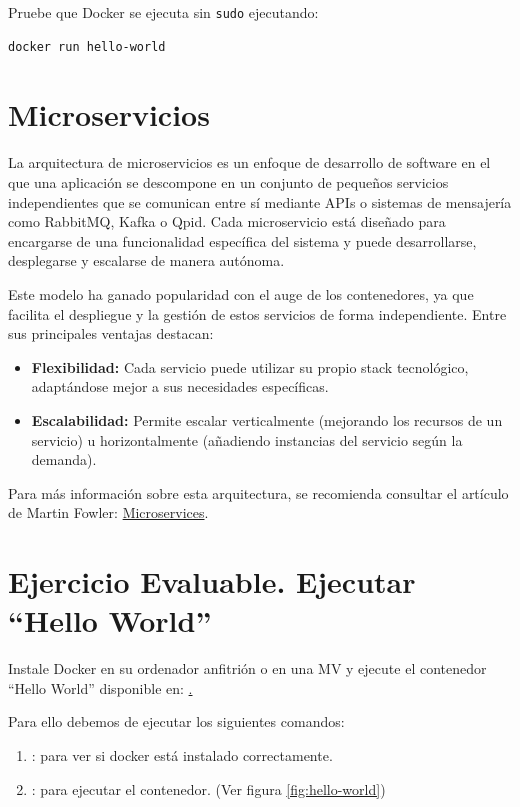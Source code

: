 Pruebe que Docker se ejecuta sin \texttt{sudo} ejecutando:

\begin{lstlisting}[style=customstyle]
docker run hello-world
\end{lstlisting}


\section{Microservicios}

La arquitectura de microservicios es un enfoque de desarrollo de software en el que una aplicación se descompone en un conjunto de pequeños servicios independientes que se comunican entre sí mediante APIs o sistemas de mensajería como RabbitMQ, Kafka o Qpid. Cada microservicio está diseñado para encargarse de una funcionalidad específica del sistema y puede desarrollarse, desplegarse y escalarse de manera autónoma.

Este modelo ha ganado popularidad con el auge de los contenedores, ya que facilita el despliegue y la gestión de estos servicios de forma independiente. Entre sus principales ventajas destacan:

\begin{itemize}
    \item \textbf{Flexibilidad:} Cada servicio puede utilizar su propio stack tecnológico, adaptándose mejor a sus necesidades específicas.
    \item \textbf{Escalabilidad:} Permite escalar verticalmente (mejorando los recursos de un servicio) u horizontalmente (añadiendo instancias del servicio según la demanda).
\end{itemize}

Para más información sobre esta arquitectura, se recomienda consultar el artículo de Martin Fowler: \href{https://martinfowler.com/articles/microservices.html}{Microservices}.

\section{Ejercicio Evaluable. Ejecutar “Hello World”}

Instale Docker en su ordenador anfitrión o en una MV y ejecute el contenedor
``Hello World'' disponible en: \href{https://hub.docker.com/_/hello-world}.

Para ello debemos de ejecutar los siguientes comandos:

\begin{enumerate}[label=\textbf{\arabic*:}]
    \item {}: para ver si docker está instalado correctamente.
    \item {}: para ejecutar el contenedor. (Ver figura \ref{fig:hello-world})
\end{enumerate}

